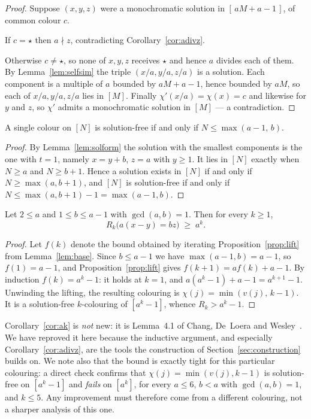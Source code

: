 \begin{proof}
Suppose $(x,y,z)$ were a monochromatic solution in $[\,aM+a-1\,]$, of common
colour $c$.

If $c = \star$ then $a \nmid z$, contradicting Corollary~\ref{cor:adivz}.

Otherwise $c \neq \star$, so none of $x,y,z$ receives $\star$ and hence
$a$ divides each of them. By Lemma~\ref{lem:selfsim} the triple
$(x/a, y/a, z/a)$ is a solution. Each component is a multiple of $a$ bounded
by $aM + a - 1$, hence bounded by $aM$, so each of $x/a, y/a, z/a$ lies in
$[M]$. Finally
$\chi'(x/a) = \chi(x) = c$ and likewise for $y$ and $z$, so $\chi'$ admits a
monochromatic solution in $[M]$ --- a contradiction.
\end{proof}

\begin{lemma}\label{lem:base}
A single colour on $[N]$ is solution-free if and only if
$N \le \max(a-1,\, b)$.
\end{lemma}

\begin{proof}
By Lemma~\ref{lem:solform} the solution with the smallest components is the
one with $t = 1$, namely $x = y + b$, $z = a$ with $y \ge 1$. It lies in
$[N]$ exactly when $N \ge a$ and $N \ge b+1$. Hence a solution exists in
$[N]$ if and only if $N \ge \max(a, b+1)$, and $[N]$ is solution-free if and
only if $N \le \max(a, b+1) - 1 = \max(a-1, b)$.
\end{proof}

\begin{corollary}\label{cor:ak}
Let $2 \le a$ and $1 \le b \le a-1$ with $\gcd(a,b) = 1$. Then for every
$k \ge 1$,
\[
  R_k\bigl(a(x-y) = bz\bigr) \;\ge\; a^k .
\]
\end{corollary}

\begin{proof}
Let $f(k)$ denote the bound obtained by iterating
Proposition~\ref{prop:lift} from Lemma~\ref{lem:base}. Since $b \le a-1$ we
have $\max(a-1,b) = a-1$, so $f(1) = a - 1$, and
Proposition~\ref{prop:lift} gives $f(k+1) = a f(k) + a - 1$. By induction
$f(k) = a^k - 1$: it holds at $k=1$, and
$a(a^k - 1) + a - 1 = a^{k+1} - 1$. Unwinding the lifting, the resulting
colouring is $\chi(j) = \min(v(j),\, k-1)$. It is a solution-free
$k$-colouring of $[a^k - 1]$, whence $R_k > a^k - 1$.
\end{proof}

\begin{remark}\label{rem:notnew}
Corollary~\ref{cor:ak} is \emph{not} new: it is Lemma~4.1 of
Chang, De~Loera and Wesley~\cite{CDW2022}. We have reproved it here because
the inductive argument, and especially Corollary~\ref{cor:adivz}, are the
tools the construction of Section~\ref{sec:construction} builds on. We note
also that the bound is exactly tight for this particular colouring: a direct
check confirms that $\chi(j) = \min(v(j), k-1)$ is solution-free on
$[a^k-1]$ and \emph{fails} on $[a^k]$, for every $a \le 6$, $b < a$ with
$\gcd(a,b)=1$, and $k \le 5$. Any improvement must therefore come from a
different colouring, not a sharper analysis of this one.
\end{remark}
